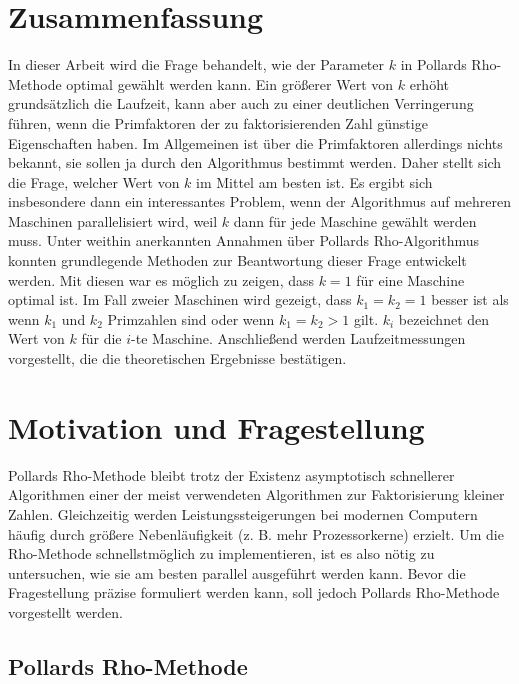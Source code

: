 \documentclass[a4paper, 11pt, ngerman]{article}
\theoremstyle{definition}
\theoremstyle{plain}
\theoremstyle{remark}
\begin{document}
\newpage

\section{Zusammenfassung}

In dieser Arbeit wird die Frage behandelt, wie der Parameter $k$ in Pollards Rho-Methode optimal gewählt werden kann. Ein größerer Wert von $k$ erhöht grundsätzlich die Laufzeit, kann aber auch zu einer deutlichen Verringerung führen, wenn die Primfaktoren der zu faktorisierenden Zahl günstige Eigenschaften haben. Im Allgemeinen ist über die Primfaktoren allerdings nichts bekannt, sie sollen ja durch den Algorithmus bestimmt werden. Daher stellt sich die Frage, welcher Wert von $k$ im Mittel am besten ist. Es ergibt sich insbesondere dann ein interessantes Problem, wenn der Algorithmus auf mehreren Maschinen parallelisiert wird, weil $k$ dann für jede Maschine gewählt werden muss. Unter weithin anerkannten Annahmen über Pollards Rho-Algorithmus konnten grundlegende Methoden zur Beantwortung dieser Frage entwickelt werden. Mit diesen war es möglich zu zeigen, dass $k = 1$ für eine Maschine optimal ist. Im Fall zweier Maschinen wird gezeigt, dass $k_1 = k_2 = 1$ besser ist als wenn $k_1$ und $k_2$ Primzahlen sind oder wenn $k_1 = k_2 > 1$ gilt. $k_i$ bezeichnet den Wert von $k$ für die $i$-te Maschine. Anschließend werden Laufzeitmessungen vorgestellt, die die theoretischen Ergebnisse bestätigen.

\section{Motivation und Fragestellung}

Pollards Rho-Methode bleibt trotz der Existenz asymptotisch schnellerer Algorithmen einer der meist verwendeten Algorithmen zur Faktorisierung kleiner Zahlen. Gleichzeitig werden Leistungssteigerungen bei modernen Computern häufig durch größere Nebenläufigkeit (z. B. mehr Prozessorkerne) erzielt. Um die Rho-Methode schnellstmöglich zu implementieren, ist es also nötig zu untersuchen, wie sie am besten parallel ausgeführt werden kann. Bevor die Fragestellung präzise formuliert werden kann, soll jedoch Pollards Rho-Methode vorgestellt werden.

\subsection{Pollards Rho-Methode}
\label{sec:pollards-rho-method}
\end{document}
